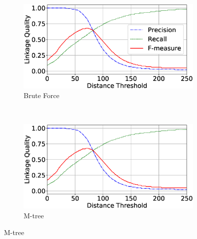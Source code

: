 \documentclass{llncs}
\begin{document}
\begin{figure}
\centering
\begin{subfigure}{.47\textwidth}
  \centering
\includegraphics[width=\textwidth]{figures/plotLQ-cora-brute}
\vspace{-6mm}
\caption{Brute Force}
\end{subfigure}%
~~
\begin{subfigure}{.47\textwidth}
  \centering
\includegraphics[width=\textwidth]{figures/plotLQ-cora-mtree}
\vspace{-6mm}
\caption{M-tree}
\end{subfigure} \vspace{3mm}


\end{figure}
\end{document}
